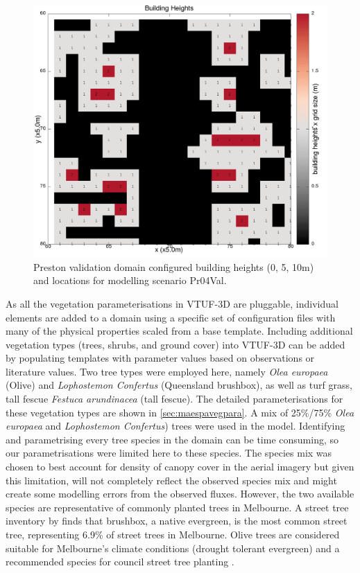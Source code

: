 \documentclass[final,3p,times,authoryear]{elsarticle}
\begin{document}
\begin{figure}[!htbp]
\includegraphics[trim = 0mm 0mm 0mm 0mm, clip, scale=0.20]{images/CentralBuildingHeights.png} 
\caption{Preston validation domain configured building heights (0, 5, 10m) and locations for modelling scenario Pr04Val.\label{fig:PrestonBldHt}}      
\end{figure}

As all the vegetation parameterisations in VTUF-3D are pluggable, individual elements are added to a domain using a specific set of configuration files with many of the physical properties scaled from a base template.  Including additional vegetation types (trees, shrubs, and ground cover) into VTUF-3D can be added by populating templates with parameter values based on observations or literature values. Two tree types were employed here, namely \textit{Olea europaea} (Olive) and \textit{Lophostemon Confertus} (Queensland brushbox), as well as turf grass, tall fescue \textit{Festuca arundinacea} (tall fescue). The detailed parameterisations for these vegetation types are shown in \ref{sec:maespavegpara}. A mix of 25\%/75\% \textit{Olea europaea} and \textit{Lophostemon Confertus}) trees were used in the model. Identifying and parametrising every tree species in the domain can be time consuming, so our parametrisations were limited here to these species. The species mix was chosen to best account for density of canopy cover in the aerial imagery but given this limitation, will not completely reflect the observed species mix and might create some modelling errors from the observed fluxes. However, the two available species are representative of commonly planted trees in Melbourne. A street tree inventory by \cite{Frank2006} finds that brushbox, a native evergreen, is the most common street tree, representing 6.9\% of street trees in Melbourne. Olive trees are considered suitable for Melbourne's climate conditions (drought tolerant evergreen) and a recommended species for council street tree planting \citep{PortPhillip2010}.
\end{document}
